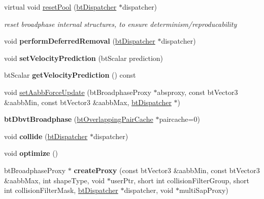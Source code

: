 \begin{DoxyCompactItemize}
virtual void \hyperlink{structbtDbvtBroadphase_a4d27a2ffb543aa23bb82fcf50ff25341}{reset\+Pool} (\hyperlink{classbtDispatcher}{bt\+Dispatcher} $\ast$dispatcher)
\begin{DoxyCompactList}\small\item\em reset broadphase internal structures, to ensure determinism/reproducability \end{DoxyCompactList}\item 
\mbox{\label{structbtDbvtBroadphase_a0312f8146aadca9e83cd22fb10ad3b0e}} 
void {\bfseries perform\+Deferred\+Removal} (\hyperlink{classbtDispatcher}{bt\+Dispatcher} $\ast$dispatcher)
\item 
\mbox{\label{structbtDbvtBroadphase_a21a127eac7b3924751a610eca457f474}} 
void {\bfseries set\+Velocity\+Prediction} (bt\+Scalar prediction)
\item 
\mbox{\label{structbtDbvtBroadphase_a53becf9b388486176674a353a3d0f4f7}} 
bt\+Scalar {\bfseries get\+Velocity\+Prediction} () const
\item 
void \hyperlink{structbtDbvtBroadphase_a645dd617d0bbe7767859f424e2ee18c1}{set\+Aabb\+Force\+Update} (bt\+Broadphase\+Proxy $\ast$absproxy, const bt\+Vector3 \&aabb\+Min, const bt\+Vector3 \&aabb\+Max, \hyperlink{classbtDispatcher}{bt\+Dispatcher} $\ast$)
\item 
\mbox{\label{structbtDbvtBroadphase_a8a7d83c74abbacde98e22f16eebed62c}} 
{\bfseries bt\+Dbvt\+Broadphase} (\hyperlink{classbtOverlappingPairCache}{bt\+Overlapping\+Pair\+Cache} $\ast$paircache=0)
\item 
\mbox{\label{structbtDbvtBroadphase_a3885d96310bbc87422c5b4b5f35db7e9}} 
void {\bfseries collide} (\hyperlink{classbtDispatcher}{bt\+Dispatcher} $\ast$dispatcher)
\item 
\mbox{\label{structbtDbvtBroadphase_a63bb26aa6b0ad6e91c5fbc938358d93b}} 
void {\bfseries optimize} ()
\item 
\mbox{\label{structbtDbvtBroadphase_af834a34a4f816209993eff2eedc6291e}} 
bt\+Broadphase\+Proxy $\ast$ {\bfseries create\+Proxy} (const bt\+Vector3 \&aabb\+Min, const bt\+Vector3 \&aabb\+Max, int shape\+Type, void $\ast$user\+Ptr, short int collision\+Filter\+Group, short int collision\+Filter\+Mask, \hyperlink{classbtDispatcher}{bt\+Dispatcher} $\ast$dispatcher, void $\ast$multi\+Sap\+Proxy)

\end{DoxyCompactItemize}
